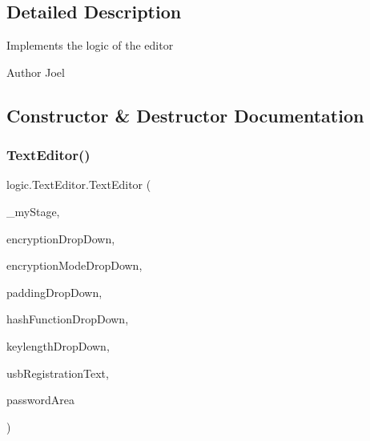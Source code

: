 \subsection{Detailed Description}
Implements the logic of the editor \begin{DoxyAuthor}{Author}
Joel 
\end{DoxyAuthor}


\subsection{Constructor \& Destructor Documentation}
\mbox{\label{classlogic_1_1_text_editor_a1ee7c49f953dac5de4dfbd8e8c350e76}} 
\subsubsection{\texorpdfstring{Text\+Editor()}{TextEditor()}}
{\footnotesize\ttfamily logic.\+Text\+Editor.\+Text\+Editor (\begin{DoxyParamCaption}\item[{Stage}]{\+\_\+my\+Stage,  }\item[{Combo\+Box$<$ \mbox{\hyperlink{enumenums_1_1_encryption_type}{Encryption\+Type}} $>$}]{encryption\+Drop\+Down,  }\item[{Combo\+Box$<$ \mbox{\hyperlink{enumenums_1_1_encryption_mode}{Encryption\+Mode}} $>$}]{encryption\+Mode\+Drop\+Down,  }\item[{Combo\+Box$<$ \mbox{\hyperlink{enumenums_1_1_padding_type}{Padding\+Type}} $>$}]{padding\+Drop\+Down,  }\item[{Combo\+Box$<$ \mbox{\hyperlink{enumenums_1_1_hash_function}{Hash\+Function}} $>$}]{hash\+Function\+Drop\+Down,  }\item[{Combo\+Box$<$ \mbox{\hyperlink{enumenums_1_1_key_length}{Key\+Length}} $>$}]{keylength\+Drop\+Down,  }\item[{Text}]{usb\+Registration\+Text,  }\item[{Password\+Field}]{password\+Area }\end{DoxyParamCaption})}

